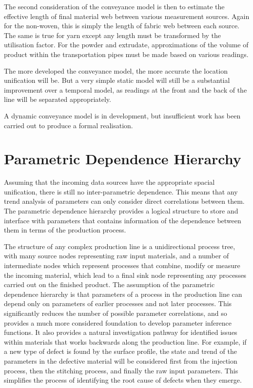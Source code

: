 \documentclass[12pt]{report}
\begin{document}
The second consideration of the conveyance model is then to estimate the effective length of final material web between various measurement sources. Again for the non-woven, this is simply the length of fabric web between each source. The same is true for yarn except any length must be transformed by the utilisation factor. For the powder and extrudate, approximations of the volume of product within the transportation pipes must be made based on various readings. 

The more developed the conveyance model, the more accurate the location unification will be. But a very simple static model will still be a substantial improvement over a temporal model, as readings at the front and the back of the line will be separated appropriately.

A dynamic conveyance model is in development, but insufficient work has been carried out to produce a formal realisation.

\section{Parametric Dependence Hierarchy}

Assuming that the incoming data sources have the appropriate spacial unification, there is still no inter-parametric dependence. This means that any trend analysis of parameters can only consider direct correlations between them. The parametric dependence hierarchy provides a logical structure to store and interface with parameters that contains information of the dependence between them in terms of the production process.

The structure of any complex production line is a unidirectional process tree, with many source nodes representing raw input materials, and a number of intermediate nodes which represent processes that combine, modify or measure the incoming material, which lead to a final sink node representing any processes carried out on the finished product. The assumption of the parametric dependence hierarchy is that parameters of a process in the production line can depend only on parameters of earlier processes and not later processes. This significantly reduces the number of possible parameter correlations, and so provides a much more considered foundation to develop parameter inference functions. It also provides a natural investigation pathway for identified issues within materials that works backwards along the production line. For example, if a new type of defect is found by the surface profile, the state and trend of the parameters in the defective material will be considered first from the injection process, then the stitching process, and finally the raw input parameters. This simplifies the process of identifying the root cause of defects when they emerge.
\end{document}
